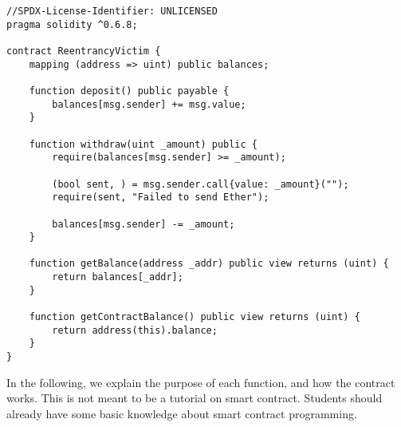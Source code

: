 \begin{lstlisting}[language=Solidity, 
      caption={The vulnerable smart contract (\texttt{ReentrancyVictim.sol})}]
//SPDX-License-Identifier: UNLICENSED
pragma solidity ^0.6.8;

contract ReentrancyVictim {
    mapping (address => uint) public balances;

    function deposit() public payable {
        balances[msg.sender] += msg.value;
    }

    function withdraw(uint _amount) public {
        require(balances[msg.sender] >= _amount);

        (bool sent, ) = msg.sender.call{value: _amount}("");
        require(sent, "Failed to send Ether");

        balances[msg.sender] -= _amount;
    }

    function getBalance(address _addr) public view returns (uint) {
        return balances[_addr];
    }

    function getContractBalance() public view returns (uint) {
        return address(this).balance;
    }
}
\end{lstlisting}

In the following, we explain the purpose of each function, and  
how the contract works. This is not meant to be a tutorial on 
smart contract. Students should already have some basic knowledge
about smart contract programming. 

